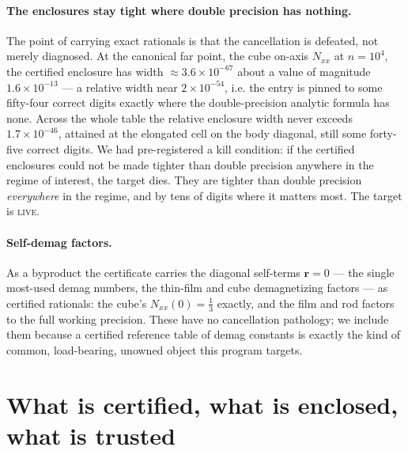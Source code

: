 \documentclass[11pt]{amsart}
\theoremstyle{plain}
\theoremstyle{definition}
\theoremstyle{remark}
\begin{document}
\paragraph{The enclosures stay tight where double precision has nothing.}
The point of carrying exact rationals is that the cancellation is defeated, not
merely diagnosed. At the canonical far point, the cube on-axis $N_{xx}$ at
$n=10^{4}$, the certified enclosure has width $\approx 3.6\times10^{-67}$ about a
value of magnitude $1.6\times10^{-13}$ --- a relative width near $2\times10^{-54}$,
i.e. the entry is pinned to some fifty-four correct digits exactly where the
double-precision analytic formula has none. Across the whole table the relative
enclosure width never exceeds $1.7\times10^{-46}$, attained at the elongated cell
on the body diagonal, still some forty-five correct digits. We had pre-registered a kill
condition: if the certified enclosures could not be made tighter than double
precision anywhere in the regime of interest, the target dies. They are tighter
than double precision \emph{everywhere} in the regime, and by tens of digits
where it matters most. The target is \textsc{live}.

\paragraph{Self-demag factors.}
As a byproduct the certificate carries the diagonal self-terms $\mathbf r=0$ ---
the single most-used demag numbers, the thin-film and cube demagnetizing factors
--- as certified rationals: the cube's $N_{xx}(0)=\tfrac13$ exactly, and the film
and rod factors to the full working precision. These have no cancellation
pathology; we include them because a certified reference table of demag
constants is exactly the kind of common, load-bearing, unowned object this
program targets.

\section{What is certified, what is enclosed, what is trusted}\label{sec:trusted}
\end{document}
